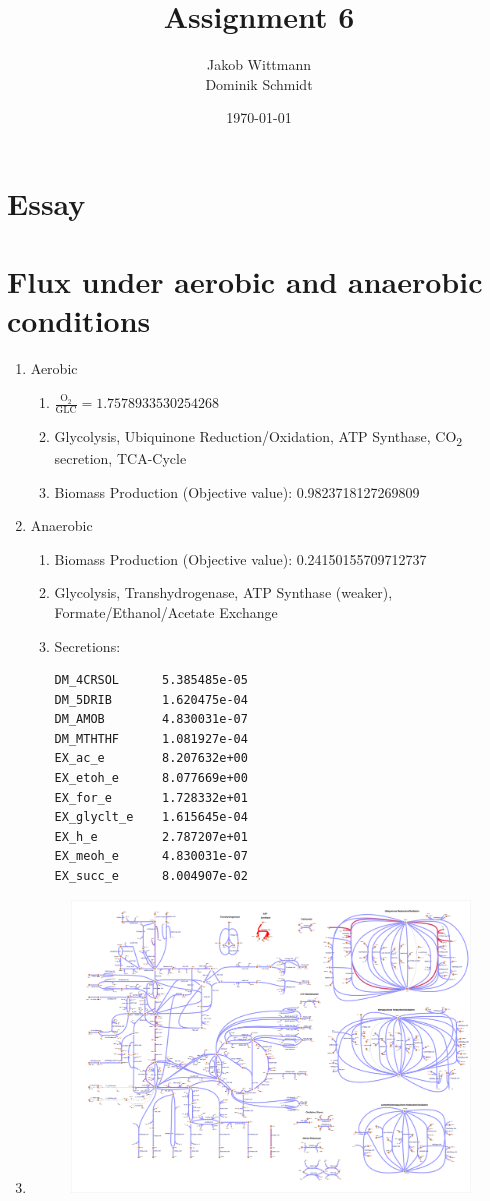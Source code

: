 \documentclass{scrartcl}
\title{Assignment 6}
\author{Jakob Wittmann\\Dominik Schmidt}
\date{\today}
\begin{document}
\maketitle
\section{Essay}
\section{Flux under aerobic and anaerobic conditions}
\begin{enumerate}
\item Aerobic
\begin{enumerate}
\item $\mathrm{\frac{O_2}{GLC}} = 1.7578933530254268$
\item Glycolysis, Ubiquinone Reduction/Oxidation, ATP Synthase, CO\textsubscript{2} secretion, TCA-Cycle
\item Biomass Production (Objective value): 0.9823718127269809
\end{enumerate}
\item Anaerobic
\begin{enumerate}
\item Biomass Production (Objective value): 0.24150155709712737
\item Glycolysis, Transhydrogenase, ATP Synthase (weaker), Formate/Ethanol/Acetate Exchange
\item Secretions: 
\begin{lstlisting}
DM_4CRSOL      5.385485e-05
DM_5DRIB       1.620475e-04
DM_AMOB        4.830031e-07
DM_MTHTHF      1.081927e-04
EX_ac_e        8.207632e+00
EX_etoh_e      8.077669e+00
EX_for_e       1.728332e+01
EX_glyclt_e    1.615645e-04
EX_h_e         2.787207e+01
EX_meoh_e      4.830031e-07
EX_succ_e      8.004907e-02
\end{lstlisting}
\end{enumerate}
\item 
\begin{figure}[H]
	\centering
	\includegraphics[max width=\linewidth]{src/2_a.pdf}

\end{figure}
\end{enumerate}
\end{document}
